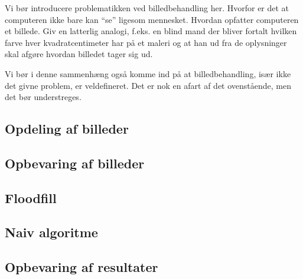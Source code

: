 {
{\sffamily Vi bør introducere problematikken ved billedbehandling her.
Hvorfor er det at computeren ikke bare kan ``se'' ligesom mennesket.
Hvordan opfatter computeren et billede. Giv en latterlig analogi, f.eks.
en blind mand der bliver fortalt hvilken farve hver kvadratcentimeter
har på et maleri og at han ud fra de oplysninger skal afgøre hvordan
billedet tager sig ud.

Vi bør i denne sammenhæng også komme ind på at billedbehandling, især
ikke det givne problem, er veldefineret. Det er nok en afart af det
ovenstående, men det bør understreges.
}

\subsection{Opdeling af billeder}


\subsection{Opbevaring af billeder}


\subsection{Floodfill}


\subsection{Naiv algoritme}


\subsection{Opbevaring af resultater\label{section_results}}


}

